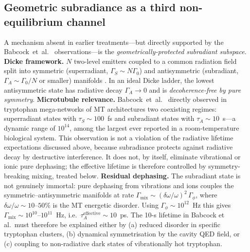 \documentclass[twocolumn,10pt]{article}
\begin{document}
\subsection{Geometric subradiance as a third non-equilibrium channel}
\label{sec:subradiance}
A mechanism absent in earlier treatments---but directly supported by the
Babcock~et~al.\ \cite{Babcock2024} observations---is the
\emph{geometrically-protected subradiant subspace}.
\textbf{Dicke framework.} $N$ two-level emitters coupled to a common
radiation field split into symmetric (superradiant, $\Gamma_S\sim N\Gamma_0$)
and antisymmetric (subradiant, $\Gamma_A\sim \Gamma_0/N$ or smaller)
manifolds \cite{Dicke1954,Gross1982}. In an ideal Dicke ladder, the lowest
antisymmetric state has radiative decay $\Gamma_A\to 0$ and is
\emph{decoherence-free by pure symmetry}.
\textbf{Microtubule relevance.} Babcock~et~al.\ \cite{Babcock2024} directly
observed in tryptophan mega-networks of MT architectures two coexisting
regimes: superradiant states with $\tau_S\sim 100$~fs and subradiant
states with $\tau_A\sim 10$~s---a dynamic range of $10^{14}$, among the
largest ever reported in a room-temperature biological system. This observation is not a violation of the radiative lifetime expectations
discussed above, because subradiance protects against radiative decay by
destructive interference. It does not, by itself, eliminate vibrational or
ionic pure dephasing; the effective lifetime is therefore controlled by
symmetry-breaking mixing, treated below.
\textbf{Residual dephasing.} The subradiant state is not genuinely
immortal: pure dephasing from vibrations and ions couples the
symmetric--antisymmetric manifolds at rate
$\Gamma_{\text{mix}}\sim (\delta\omega/\omega)^2\,\Gamma_\phi$, where
$\delta\omega/\omega\sim 10\text{--}50\%$ is the MT energetic disorder.
Using $\Gamma_\phi\sim 10^{12}$~Hz this gives $\Gamma_{\text{mix}}
\sim 10^{10}\text{--}10^{11}$~Hz, i.e.\ $\tau_A^{\text{effective}}
\sim 10$~ps. The 10-s lifetime in Babcock et al.\ must therefore be
explained either by (a) reduced disorder in specific tryptophan clusters,
(b) dynamical symmetrisation by the cavity QED field, or (c) coupling to
non-radiative dark states of vibrationally hot tryptophan.
\end{document}
